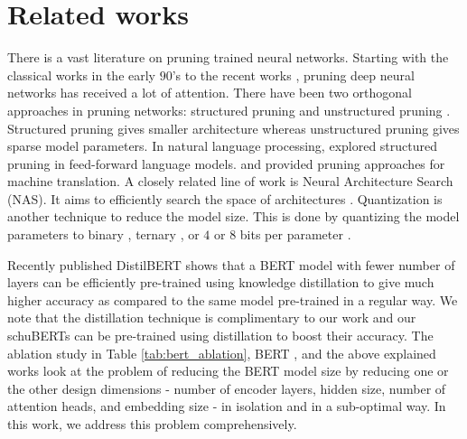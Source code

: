 \documentclass[11pt,a4paper]{article}
\begin{document}
\section{Related works}
There is a vast literature on pruning trained neural networks. Starting with the classical works \citet{lecun1990optimal,hassibi1993second}
in the early $90$'s to the recent works \citet{han2015deep}, pruning deep neural networks has received a lot of attention. There have been two orthogonal approaches in pruning networks: structured pruning \citep{li2016pruning, molchanov2016pruning} and unstructured pruning \citep{anwar2017structured}. Structured pruning gives smaller architecture whereas unstructured pruning gives sparse model parameters. 
In natural language processing, \citet{murray2015auto} explored structured pruning in feed-forward language models. \citet{see2016compression} and \citet{kim2016sequence} provided pruning approaches for machine translation. 
A closely related line of work is Neural Architecture Search (NAS). 
It aims to efficiently search the space of architectures \citep{pham2018efficient, liu2018darts,singh2019darc}. Quantization is another technique to reduce the model size. This is done by quantizing the model parameters to binary \citep{rastegari2016xnor, hubara2017quantized}, ternary \citep{zhu2016trained}, or $4$ or $8$ bits per parameter \citep{han2015deep}. 

Recently published DistilBERT \citep{sanh2019distilbert} shows that a BERT model with fewer number of layers can be efficiently pre-trained using knowledge distillation to give much higher accuracy as compared to the same model pre-trained in a regular way. We note that the distillation technique is complimentary to our work and our schuBERTs can be pre-trained using distillation to boost their accuracy.
The ablation study in Table \ref{tab:bert_ablation}, BERT \citep{devlin2018bert}, and the above explained works \citep{michel2019sixteen, lan2019albert} look at the problem of reducing the BERT model size by reducing one or the other design dimensions - number of encoder layers, hidden size, number of attention heads, and embedding size - in isolation and in a sub-optimal way. In this work, we address this problem comprehensively. 
\end{document}
